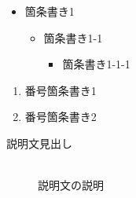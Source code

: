 \begin{reviewcolumn}
\begin{itemize}
\item 箇条書き1

\begin{itemize}
\item 箇条書き1{-}1

\begin{itemize}
\item 箇条書き1{-}1{-}1
\end{itemize}

\end{itemize}

\end{itemize}

\begin{enumerate}
\item 番号箇条書き1
\item 番号箇条書き2
\end{enumerate}

\begin{description}
\item[説明文見出し] \mbox{} \\
説明文の説明
\end{description}

\end{reviewcolumn}


